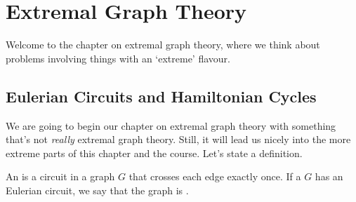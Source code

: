 \documentclass[a4paper]{scrreprt}
\begin{document}
\chapter{Extremal Graph Theory}

Welcome to the chapter on extremal graph theory, where we think about problems involving things with an `extreme' flavour.

\section{Eulerian Circuits and Hamiltonian Cycles}

We are going to begin our chapter on extremal graph theory with something that's not \emph{really} extremal graph theory. Still, it will lead us nicely into the more extreme parts of this chapter and the course. Let's state a definition.

\begin{definition}
	An  is a circuit in a graph $G$ that crosses each edge exactly once. If a $G$ has an Eulerian circuit, we say that the graph is .
\end{definition}
\end{document}
